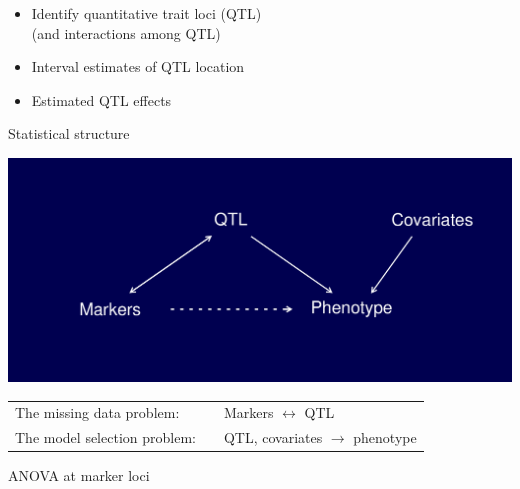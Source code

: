 \documentclass[12pt]{article}
\newcommand{\headsize}{\fontsize{35}{35} \selectfont}
\newcommand{\smallersize}{\fontsize{20}{25} \selectfont}
\begin{document}
\hfill \begin{minipage}[t]{9.5in}
\begin{itemize}
\itemsep24pt
\item Identify quantitative trait loci (QTL)\\[6pt]
   {\color{myblue}   (and interactions among QTL)}
\item Interval estimates of QTL location
\item Estimated QTL effects
\end{itemize} \end{minipage}

\newpage

\headsize \color{myyellow}
\hfill \begin{minipage}{5.75in}
\centering
Statistical structure
\end{minipage}

\vspace{2cm} \color{mywhite} \smallersize

\centerline{\includegraphics{Figs/structure.pdf}}

\vspace{15mm}

\hspace*{3cm}\begin{tabular}{lll}
{\color{mypink} The missing data problem:}  & \hspace{15mm} &
Markers $\longleftrightarrow$ QTL \\[15mm]

{\color{mypink} The model selection problem:}
& & QTL, covariates $\longrightarrow$ phenotype
\end{tabular}




\newpage



\headsize \color{myyellow}
\hfill\begin{minipage}{5.75in}
\centering
ANOVA at marker loci
\end{minipage}
\end{document}
